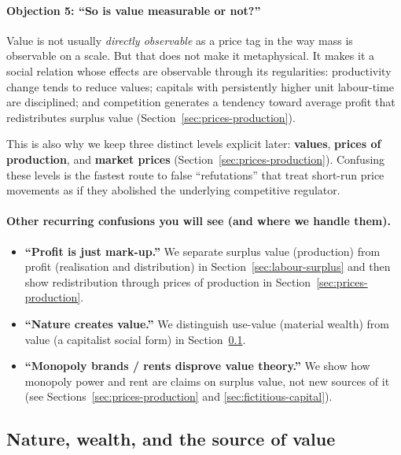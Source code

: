 \paragraph{Objection 5: ``So is value measurable or not?''}
Value is not usually \emph{directly observable} as a price tag in the way mass is observable on a scale. But that does not make it metaphysical. It makes it a social
relation whose effects are observable through its regularities: productivity change tends to reduce values; capitals with persistently higher unit labour-time are
disciplined; and competition generates a tendency toward average profit that redistributes surplus value (Section~\ref{sec:prices-production}).\cite{Marx1867,Shaikh2016}

This is also why we keep three distinct levels explicit later: \textbf{values}, \textbf{prices of production}, and \textbf{market prices} (Section~\ref{sec:prices-production}).
Confusing these levels is the fastest route to false ``refutations'' that treat short-run price movements as if they abolished the underlying competitive regulator.

\paragraph{Other recurring confusions you will see (and where we handle them).}
\begin{itemize}[leftmargin=1.5em]
  \item \textbf{``Profit is just mark-up.''} We separate surplus value (production) from profit (realisation and distribution)
  in Section~\ref{sec:labour-surplus} and then show redistribution through prices of production in Section~\ref{sec:prices-production}.
  \item \textbf{``Nature creates value.''} We distinguish use-value (material wealth) from value (a capitalist social form) in
  Section~\ref{sec:nature-value}.
  \item \textbf{``Monopoly brands / rents disprove value theory.''} We show how monopoly power and rent are claims on surplus value,
  not new sources of it (see Sections~\ref{sec:prices-production} and \ref{sec:fictitious-capital}).
\end{itemize}


\subsection{Nature, wealth, and the source of value}
\label{sec:nature-value}

